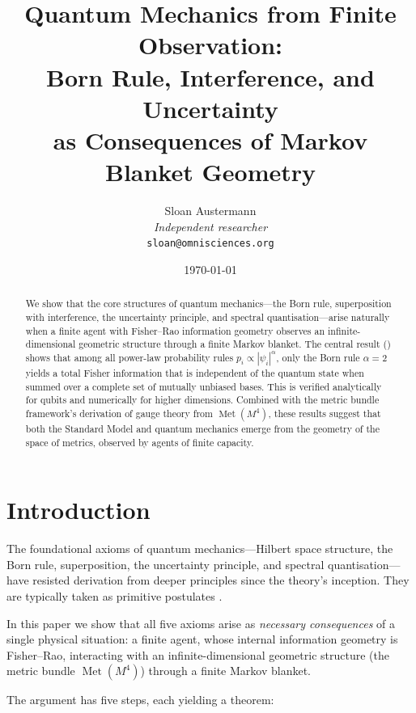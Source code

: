 \documentclass[12pt,a4paper]{article}
\title{\textbf{Quantum Mechanics from Finite Observation:\\
Born Rule, Interference, and Uncertainty\\
as Consequences of Markov Blanket Geometry}}
\author{Sloan Austermann\\[4pt]
\small\textit{Independent researcher}\\
\small\texttt{sloan@omnisciences.org}}
\date{\today}
\theoremstyle{definition}
\newcommand{\Met}{\operatorname{Met}}
\begin{document}
\maketitle

\begin{abstract}
We show that the core structures of quantum mechanics---the Born rule,
superposition with interference, the uncertainty principle, and
spectral quantisation---arise naturally when a finite
agent with Fisher--Rao information geometry observes an
infinite-dimensional geometric structure through a finite Markov
blanket. The central result () shows that
among all power-law probability rules $p_i \propto |\psi_i|^\alpha$,
only the Born rule $\alpha = 2$ yields a total Fisher information that
is independent of the quantum state when summed over a complete set of
mutually unbiased bases. This is verified analytically for qubits and
numerically for higher dimensions. Combined with the metric bundle
framework's derivation of gauge theory from $\Met(M^4)$, these
results suggest that both the Standard Model and quantum mechanics
emerge from the geometry of the space of metrics, observed by agents
of finite capacity.
\end{abstract}

\tableofcontents

\section{Introduction}
\label{sec:intro}

The foundational axioms of quantum mechanics---Hilbert space structure,
the Born rule, superposition, the uncertainty principle, and spectral
quantisation---have resisted derivation from deeper principles since the
theory's inception. They are typically taken as primitive postulates
\cite{vonNeumann1932,Dirac1930}.

In this paper we show that all five axioms arise as \emph{necessary
consequences} of a single physical situation: a finite agent, whose
internal information geometry is Fisher--Rao, interacting with an
infinite-dimensional geometric structure (the metric bundle
$\Met(M^4)$) through a finite Markov blanket.

The argument has five steps, each yielding a theorem:
\end{document}
